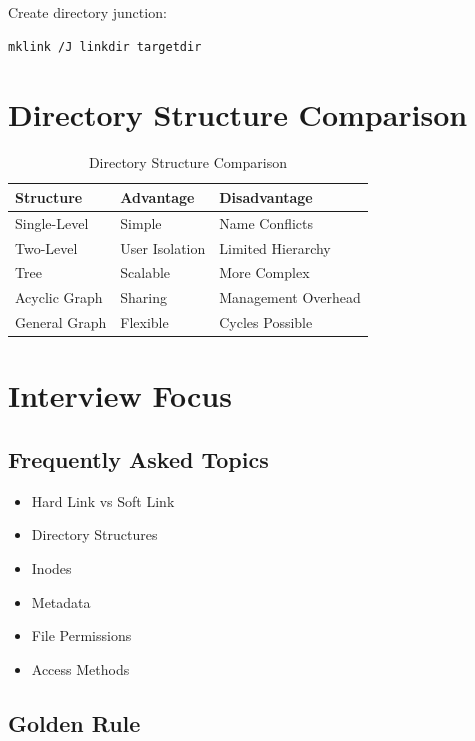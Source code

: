 Create directory junction:

\begin{verbatim}
mklink /J linkdir targetdir
\end{verbatim}

\section{Directory Structure Comparison}

\begin{table}[h]
\centering
\small
\begin{tabular}{|p{4cm}|p{4cm}|p{5cm}|}
\hline
Structure & Advantage & Disadvantage \\
\hline
Single-Level & Simple & Name Conflicts \\
\hline
Two-Level & User Isolation & Limited Hierarchy \\
\hline
Tree & Scalable & More Complex \\
\hline
Acyclic Graph & Sharing & Management Overhead \\
\hline
General Graph & Flexible & Cycles Possible \\
\hline
\end{tabular}
\caption{Directory Structure Comparison}
\end{table}

\section{Interview Focus}

\subsection{Frequently Asked Topics}

\begin{itemize}
\item Hard Link vs Soft Link
\item Directory Structures
\item Inodes
\item Metadata
\item File Permissions
\item Access Methods
\end{itemize}

\subsection{Golden Rule}

